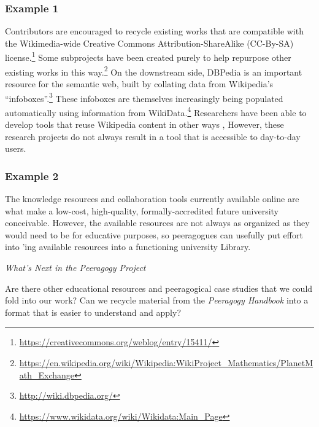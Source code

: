 \subsubsection*{Example 1}
Contributors are encouraged to recycle existing works that are compatible
with the Wikimedia-wide Creative Commons Attribution-ShareAlike (CC-By-SA) license.\footnote{\url{https://creativecommons.org/weblog/entry/15411/}}
Some subprojects have been created purely to help repurpose other existing works in this
way.\footnote{\url{https://en.wikipedia.org/wiki/Wikipedia:WikiProject_Mathematics/PlanetMath_Exchange}}
%
On the downstream side, DBPedia is an important resource for the
semantic web, built by collating data from Wikipedia's
``infoboxes''.\footnote{\url{http://wiki.dbpedia.org/}}
%
These infoboxes are themselves increasingly being populated
automatically using information from WikiData.\footnote{\url{https://www.wikidata.org/wiki/Wikidata:Main_Page}}
Researchers have been able to develop tools that reuse Wikipedia content in other ways \cite{reinhold2006wikitrails,riche2010ichase},
However, these research projects do not always result in a tool that
is accessible to day-to-day users.

\vspace{.05cm}

\subsubsection*{Example 2}
The knowledge resources and collaboration tools currently available online
are what make a low-cost, high-quality, formally-accredited future university
conceivable.  However, the available resources are not always as
organized as they would need to be for educative purposes, so peeragogues can usefully put
effort into 'ing available
resources into a functioning university Library.


\begin{framed}
\noindent 
\emph{What's Next in the Peeragogy Project}
\begin{collectinmacro}{\ReduceWN}{}{}
Are there other educational resources and peeragogical case studies
that we could fold into our work?  Can we recycle material from the
\emph{Peeragogy Handbook} into a format that is easier to understand
and apply?
\end{collectinmacro}
\ReduceWN
\end{framed}

